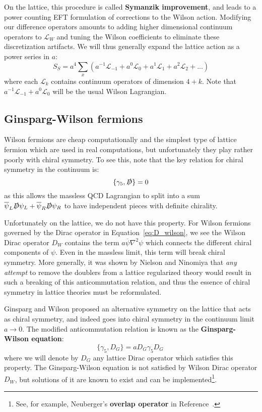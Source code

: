 \documentclass[11pt, oneside]{article}   	%
\theoremstyle{definition}
\begin{document}
On the lattice, this procedure is called \textbf{Symanzik improvement}, and leads to a power counting EFT formulation 
of corrections to the Wilson action. Modifying our difference operators amounts to adding higher dimensional continuum 
operators to $\mathcal L_W$ and tuning the Wilson coefficients to eliminate these discretization artifacts. We will thus 
generally expand the lattice action as a power series in $a$:
\begin{equation}
	S_S = a^4\sum_x\left(a^{-1} \mathcal L_{-1} + a^0 \mathcal L_0 + a^1 \mathcal L_1 + a^2 \mathcal L_2 + ...\right)
\end{equation}
where each $\mathcal L_k$ contains continuum operators of dimension $4 + k$. Note that $a^{-1} \mathcal L_{-1} + a^0 
\mathcal L_0$ will be the usual Wilson Lagrangian. 

\subsection{Ginsparg-Wilson fermions}

Wilson fermions are cheap computationally and the simplest type of lattice fermion which are used in real computations, but 
unfortunately they play rather poorly with chiral symmetry. To see this, note that the key relation for chiral symmetry in the 
continuum is:
\begin{equation}
	\{\gamma_5, \slashed D\} = 0
\end{equation}
as this allows the massless QCD Lagrangian to split into a sum $\overline\psi_L \slashed D\psi_L + \overline\psi_R 
\slashed D\psi_R$ to have independent pieces with definite chirality. 

Unfortunately on the lattice, we do not have this property. For Wilson fermions governed by the Dirac operator in 
Equation~\ref{eq:D_wilson}, we see the Wilson Dirac operator $D_W$ contains the term $a \overline\psi\nabla^2\psi$ which 
connects the different chiral components of $\psi$. Even in the massless limit, this term will break chiral symmetry. 
More generally, it was shown by Nielson and Ninomiya \cite{nogo} that \textit{any attempt} to remove the doublers from a 
lattice regularized theory would result in such a breaking of this anticommutation relation, and thus the essence of chiral 
symmetry in lattice theories must be reformulated. 

Ginsparg and Wilson \cite{ginsparg} proposed an alternative symmetry on the lattice that acts as chiral symmetry, and 
indeed goes into chiral symmetry in the continuum limit $a\rightarrow 0$. The modified anticommutation relation is known as 
the \textbf{Ginsparg-Wilson equation}:
\begin{equation}
	\{\gamma_5,  D_G\} = aD_G\gamma_5 D_G~
	\label{eq:ginsparg_wilson}
\end{equation}
where we will denote by $D_G$ any lattice Dirac operator which satisfies this property. The Ginsparg-Wilson equation is not 
satisfied by Wilson Dirac operator $D_W$, but solutions of it are known to exist and can be implemented\footnote{See, for 
example, Neuberger's \textbf{overlap operator} in Reference~\cite{neuberger}.}.
\end{document}

